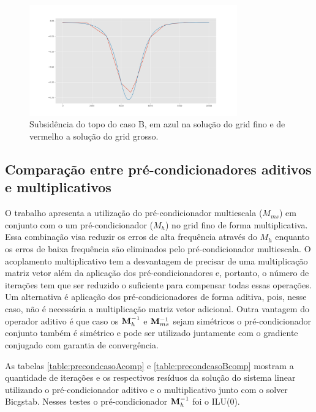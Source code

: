 \begin{figure}[!htbp]
\centering
\includegraphics[width=0.8\textwidth]{chap08/figs/Reservoir320x320_10x10_subsidence_multiscale.png}
\caption{Subsidência do topo do caso B, em azul na solução do grid fino e de vermelho a solução do grid grosso. }
\label{fig:subsidence} 
\end{figure}


\subsection{Comparação entre pré-condicionadores aditivos e multiplicativos}

O trabalho \cite{casteletto} apresenta a utilização do pré-condicionador multiescala ($M_{ms}$) em conjunto com o um pré-condicionador ($M_h$) no grid fino de forma multiplicativa. 
Essa combinação visa reduzir os erros de alta frequência através do $M_h$ enquanto os erros de baixa frequência são eliminados pelo pré-condicionador multiescala. 
O acoplamento multiplicativo tem a desvantagem de precisar de uma multiplicação matriz vetor além da aplicação dos pré-condicionadores
e, portanto, o número de iterações tem que ser reduzido o suficiente para compensar todas essas operações. Um alternativa é aplicação
dos pré-condicionadores de forma aditiva, pois, nesse caso, não é necessária a multiplicação matriz vetor adicional. Outra vantagem do operador aditivo é que caso os $\mathbf{M}^{-1}_{h}$ e $\mathbf{M}^{-1}_{ms}$ sejam simétricos o pré-condicionador conjunto também é simétrico e pode ser utilizado juntamente com o gradiente conjugado com garantia de convergência.


As tabelas \ref{table:precondcasoAcomp} e \ref{table:precondcasoBcomp} mostram a quantidade de iterações e os respectivos resíduos da solução do sistema linear utilizando o pré-condicionador aditivo e o multiplicativo junto com o solver Bicgstab. Nesses testes o pré-condicionador $\mathbf{M}^{-1}_{h}$ foi o ILU(0).

